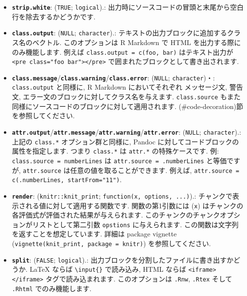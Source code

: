 \documentclass[
  11pt,
  lualatex,ja=standard,jafont=noto]{bxjsreport}
\begin{document}
\begin{itemize}
\item
  \textbf{\texttt{strip.white}}: (\texttt{TRUE}; \texttt{logical}).: 出力時にソースコードの冒頭と末尾から空白行を除去するかどうかです.
\item
  \textbf{\texttt{class.output}}: (\texttt{NULL}; \texttt{character}).: テキストの出力ブロックに追加するクラス名のベクトル. このオプションは R Markdown で HTML を出力する際にのみ機能します. 例えば \texttt{class.output = c(\textquotesingle{}foo\textquotesingle{},\ \textquotesingle{}bar\textquotesingle{})} はテキスト出力が \texttt{\textless{}pre\ class="foo\ bar"\textgreater{}\textless{}/pre\textgreater{}} で囲まれたブロックとして書き出されます.
\item
  \textbf{\texttt{class.message}}/\textbf{\texttt{class.warning}}/\textbf{\texttt{class.error}}: (\texttt{NULL}; \texttt{character})・: \texttt{class.output} と同様に, R Markdown においてそれぞれ メッセージ文, 警告文, エラー文のブロックに対してクラス名を与えます. \texttt{class.source} もまた同様にソースコードのブロックに対して適用されます. \textcite{ref}(\#code-decoration)節を参照してください.
\item
  \textbf{\texttt{attr.output}}/\textbf{\texttt{attr.message}}/\textbf{\texttt{attr.warning}}/\textbf{\texttt{attr.error}}: (\texttt{NULL}; \texttt{character}).: 上記の \texttt{class.*} オプション群と同様に, Pandoc に対してコードブロックの属性を指定します. つまり \texttt{class.*} は \texttt{attr.*} の特殊ケースです. 例: \texttt{class.source = \textquotesingle{}numberLines\textquotesingle{}} は \texttt{attr.source = \textquotesingle{}.numberLines\textquotesingle{}} と等価ですが, \texttt{attr.source} は任意の値を取ることができます. 例えば, \texttt{attr.source = c(\textquotesingle{}.numberLines\textquotesingle{},\ \textquotesingle{}startFrom="11"\textquotesingle{})}.
\item
  \textbf{\texttt{render}}: (\texttt{knitr::knit\_print}; \texttt{function(x, options, ...)}).: チャンクで表示される値に対して適用する関数です. 関数の第1引数には (\texttt{x}) はチャンクの各評価式が評価された結果が与えられます. このチャンクのチャンクオプションがリストとして第二引数 \texttt{opstions} に与えられます. この関数は文字列を返すことを想定しています. 詳細は package vignette (\texttt{vignette(\textquotesingle{}knit\_print\textquotesingle{},\ package\ =\ \textquotesingle{}knitr\textquotesingle{})}) を参照してください.
\item
  \textbf{\texttt{split}}: (\texttt{FALSE}; \texttt{logical}).: 出力ブロックを分割したファイルに書き出すかどうか. LaTeX ならば \texttt{\textbackslash{}input\{\}} で読み込み, HTML ならば \texttt{\textless{}iframe\textgreater{}\textless{}/iframe\textgreater{}} タグで読み込まれます. このオプションは \texttt{.Rnw}, \texttt{.Rtex} そして \texttt{.Rhtml} でのみ機能します.
\end{itemize}
\end{document}
